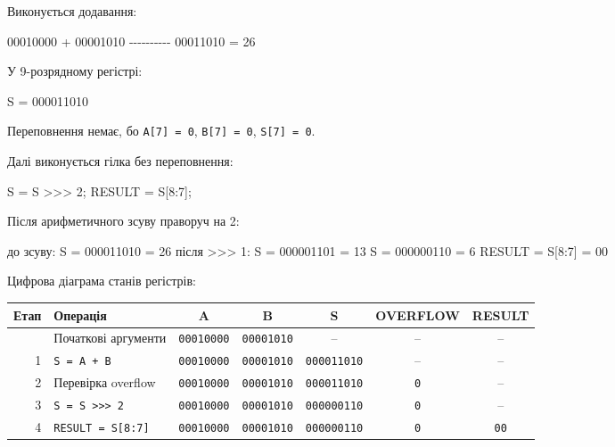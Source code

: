 \documentclass[
  11pt,
]{article}
\newenvironment{Shaded}{}{}
\newcommand{\DecValTok}[1]{\textcolor[rgb]{0.25,0.63,0.44}{#1}}
\newcommand{\NormalTok}[1]{#1}
\newcommand{\OperatorTok}[1]{\textcolor[rgb]{0.40,0.40,0.40}{#1}}
\newcounter{none} %
\begin{document}
\begin{enumerate}
  Виконується додавання:

\begin{Shaded}
\begin{Highlighting}[]
\NormalTok{  00010000}
\NormalTok{+ 00001010}
\NormalTok{{-}{-}{-}{-}{-}{-}{-}{-}{-}{-}}
\NormalTok{  00011010 = 26}
\end{Highlighting}
\end{Shaded}

  У 9-розрядному регістрі:

\begin{Shaded}
\begin{Highlighting}[]
\NormalTok{S = 000011010}
\end{Highlighting}
\end{Shaded}

  Переповнення немає, бо \texttt{A{[}7{]}\ =\ 0}, \texttt{B{[}7{]}\ =\ 0}, \texttt{S{[}7{]}\ =\ 0}.

  Далі виконується гілка без переповнення:

\begin{Shaded}
\begin{Highlighting}[]
\NormalTok{S }\OperatorTok{=}\NormalTok{ S }\OperatorTok{\textgreater{}\textgreater{}\textgreater{}} \DecValTok{2}\OperatorTok{;}
\NormalTok{RESULT }\OperatorTok{=}\NormalTok{ S}\OperatorTok{[}\DecValTok{8}\OperatorTok{:}\DecValTok{7}\OperatorTok{];}
\end{Highlighting}
\end{Shaded}

  Після арифметичного зсуву праворуч на 2:

\begin{Shaded}
\begin{Highlighting}[]
\NormalTok{до зсуву:    S = 000011010 = 26}
\NormalTok{після >>> 1: S = 000001101 = 13}
\NormalTok{S = 000000110 = 6}
\NormalTok{RESULT = S[8:7] = 00}
\end{Highlighting}
\end{Shaded}

  Цифрова діаграма станів регістрів:

  {\def\LTcaptype{none}
  \begin{longtable}[]{@{}rlccccc@{}}
  \toprule\noalign{}
  Етап & Операція & A & B & S & OVERFLOW & RESULT \\
  \midrule\noalign{}
  \endhead
  \bottomrule\noalign{}
  \endlastfoot
  0 & Початкові аргументи & \texttt{00010000} & \texttt{00001010} & -- & -- & -- \\
  1 & \texttt{S = A + B} & \texttt{00010000} & \texttt{00001010} & \texttt{000011010} & -- & -- \\
  2 & Перевірка overflow & \texttt{00010000} & \texttt{00001010} & \texttt{000011010} & \texttt{0} & -- \\
  3 & \texttt{S = S >>> 2} & \texttt{00010000} & \texttt{00001010} & \texttt{000000110} & \texttt{0} & -- \\
  4 & \texttt{RESULT = S[8:7]} & \texttt{00010000} & \texttt{00001010} & \texttt{000000110} & \texttt{0} & \texttt{00} \\
  \end{longtable}
  }


\end{enumerate}
\end{document}

